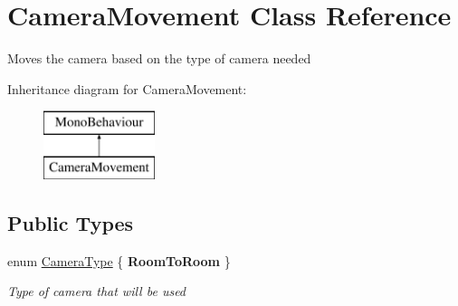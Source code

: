 \hypertarget{class_camera_movement}{}\section{Camera\+Movement Class Reference}
\label{class_camera_movement}


Moves the camera based on the type of camera needed  


Inheritance diagram for Camera\+Movement\+:\begin{figure}[H]
\begin{center}
\leavevmode
\includegraphics[height=2.000000cm]{class_camera_movement}
\end{center}
\end{figure}
\subsection*{Public Types}
\begin{DoxyCompactItemize}
\item 
enum \mbox{\hyperlink{class_camera_movement_a297cb93f5fc197103c3447dac2340a83}{Camera\+Type}} \{ {\bfseries Room\+To\+Room}
 \}
\begin{DoxyCompactList}\small\item\em Type of camera that will be used \end{DoxyCompactList}\end{DoxyCompactItemize}
